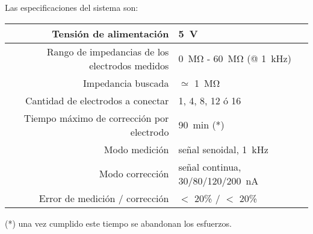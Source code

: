 Las especificaciones del sistema son:

\begin{table}[H]
\begin{center}
\begin{tabular}{|r|l|}
    \hline
    Tensión de alimentación &
    \SI{5}{\volt} \\ \hline
    Rango de impedancias de los electrodos medidos &
    \SI{0}{\mega\ohm} - \SI{60}{\mega\ohm} (@ \SI{1}{\kilo\hertz})\\ \hline
    Impedancia buscada & $\simeq$ \SI{1}{\mega\ohm}\\ \hline
    Cantidad de electrodos a conectar &
    1, 4, 8, 12 ó 16 \\ \hline
    Tiempo máximo de corrección por electrodo &
    \SI{90}{\minute} (*)\\ \hline
    Modo medición & señal senoidal, \SI{1}{\kilo\hertz} \\ \hline
    Modo corrección & señal continua, 30/80/120/\SI{200}{\nano\ampere} \\ \hline
    Error de medición / corrección & $<$ 20\% / $<$ 20\% \\ \hline
\end{tabular}
\end{center}
\end{table}

(*) una vez cumplido este tiempo se abandonan los esfuerzos.



